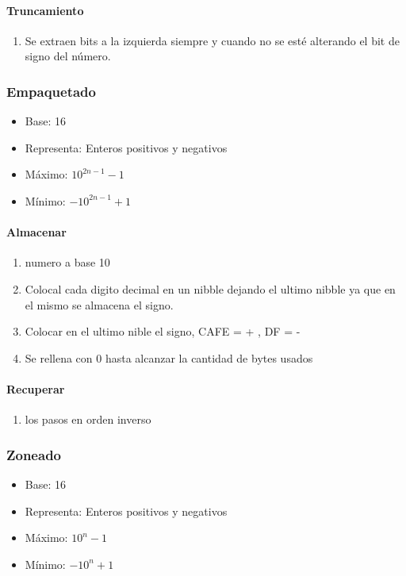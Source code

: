\paragraph{Truncamiento}
\begin{enumerate}
\item Se extraen bits a la izquierda siempre y cuando no se esté alterando el bit de signo del número.
\end{enumerate}

\subsubsection{Empaquetado}
\begin{itemize}
\item Base: 16
\item Representa: Enteros positivos y negativos
\item Máximo: $10^{2n-1} -1$
\item Mínimo: $-10^{2n-1} +1$
\end{itemize}

\paragraph{Almacenar}
\begin{enumerate}
\item numero a base 10
\item Colocal cada digito decimal en un nibble dejando el ultimo nibble ya que en el mismo se almacena el signo.
\item Colocar en el ultimo nible el signo, CAFE = + , DF = -
\item Se rellena con 0 hasta alcanzar la cantidad de bytes usados
\end{enumerate}
\paragraph{Recuperar}
\begin{enumerate}
\item los pasos en orden inverso
\end{enumerate}

\subsubsection{Zoneado}
\begin{itemize}
\item Base: 16
\item Representa: Enteros positivos y negativos
\item Máximo: $10^{n} -1$
\item Mínimo: $-10^{n} +1$
\end{itemize}

